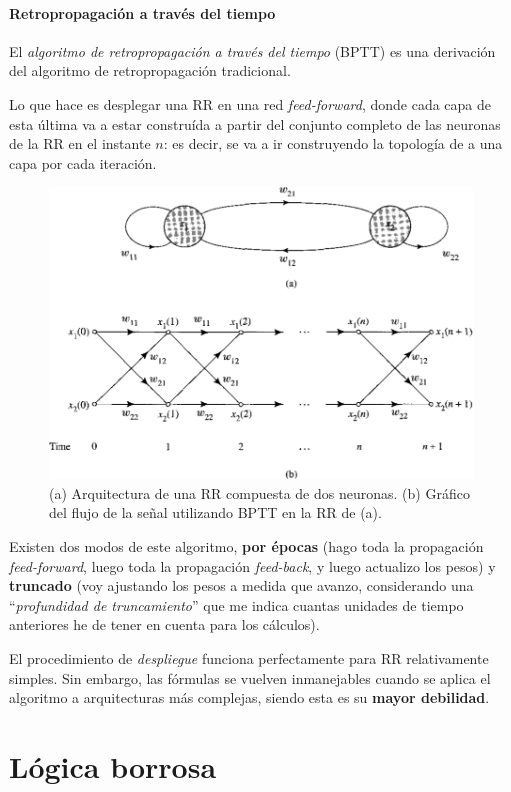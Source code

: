 \documentclass[10pt,a4paper]{article}
\begin{document}
\subsection{Retropropagación a través del tiempo}

El \textit{algoritmo de retropropagación a través del tiempo} (BPTT) es una derivación del algoritmo de retropropagación tradicional.

Lo que hace es desplegar una RR en una red \textit{feed-forward}, donde cada capa de esta última va a estar construída a partir del conjunto completo de las neuronas de la RR en el instante $n$: es decir, se va a ir construyendo la topología de a una capa por cada iteración.

\begin{figure}[ht!]
  \caption{(a) Arquitectura de una RR compuesta de dos neuronas. (b) Gráfico del flujo de la señal utilizando BPTT en la RR de (a).}
  \label{fig:BPTT}
  \centerline{\includegraphics[width=0.7\textwidth-\fboxrule-\fboxrule]{imgs/BPTT.png}}
\end{figure}

Existen dos modos de este algoritmo, \textbf{por épocas} (hago toda la propagación \textit{feed-forward}, luego toda la propagación \textit{feed-back}, y luego actualizo los pesos) y \textbf{truncado} (voy ajustando los pesos a medida que avanzo, considerando una ``\textit{profundidad de truncamiento}'' que me indica cuantas unidades de tiempo anteriores he de tener en cuenta para los cálculos).

El procedimiento de \textit{despliegue} funciona perfectamente para RR relativamente simples. Sin embargo, las fórmulas se vuelven inmanejables cuando se aplica el algoritmo a arquitecturas más complejas, siendo esta es su \textbf{mayor debilidad}.

\pagebreak
\part{Lógica borrosa}
\setcounter{section}{0}
\end{document}
